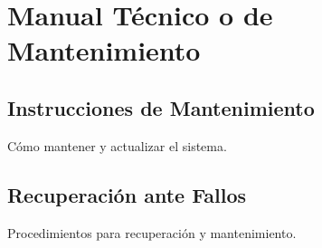 	\chapter{Manual Técnico o de Mantenimiento}
	\section{Instrucciones de Mantenimiento}
	Cómo mantener y actualizar el sistema.
	
	\section{Recuperación ante Fallos}
	Procedimientos para recuperación y mantenimiento.
	
